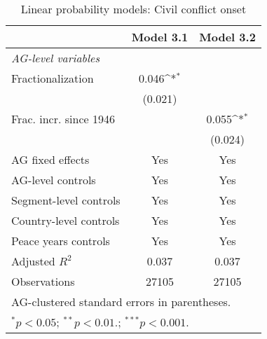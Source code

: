 \begin{table}[htbp]\centering
\def\sym#1{\ifmmode^{#1}\else\(^{#1}\)\fi}
\caption{Linear probability models: Civil conflict onset \label{tab:SEGlpmFE}}
\begin{tabular}{l*{2}{c}}
\hline\hline
                    &\multicolumn{1}{c}{Model 3.1}&\multicolumn{1}{c}{Model 3.2}\\
\hline
\textit{AG-level variables}&                     &                     \\
Fractionalization   &       0.046\sym{*}  &                     \\
                    &     (0.021)         &                     \\
Frac. incr. since 1946&                     &       0.055\sym{*}  \\
                    &                     &     (0.024)         \\
\hline
AG fixed effects    &         Yes         &         Yes         \\
AG-level controls   &         Yes         &         Yes         \\
Segment-level controls&         Yes         &         Yes         \\
Country-level controls&         Yes         &         Yes         \\
Peace years controls&         Yes         &         Yes         \\
Adjusted $ R^{2} $  &       0.037         &       0.037         \\
Observations        &       27105         &       27105         \\
\hline\hline
\multicolumn{3}{l}{\footnotesize AG-clustered standard errors in parentheses.}\\
\multicolumn{3}{l}{\footnotesize $^{*}p<0.05$; $^{**}p<0.01.$; $^{***}p<0.001.$ }\\
\end{tabular}
\end{table}
